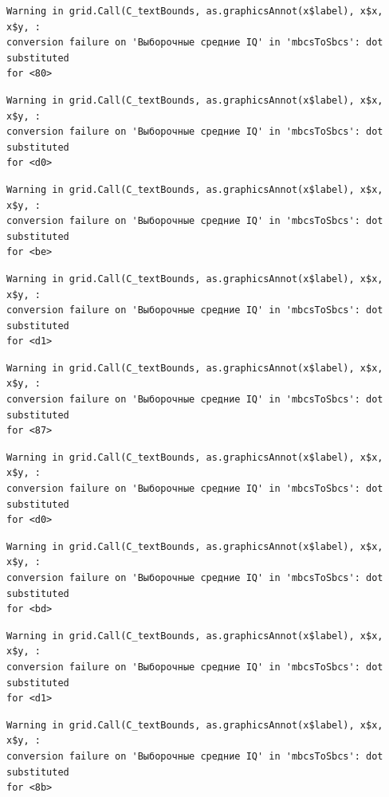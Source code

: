 \documentclass[
  letterpaper,
  DIV=11,
  numbers=noendperiod]{scrreprt}
\theoremstyle{definition}
\theoremstyle{remark}
\begin{document}
\begin{verbatim}
Warning in grid.Call(C_textBounds, as.graphicsAnnot(x$label), x$x, x$y, :
conversion failure on 'Выборочные средние IQ' in 'mbcsToSbcs': dot substituted
for <80>
\end{verbatim}

\begin{verbatim}
Warning in grid.Call(C_textBounds, as.graphicsAnnot(x$label), x$x, x$y, :
conversion failure on 'Выборочные средние IQ' in 'mbcsToSbcs': dot substituted
for <d0>
\end{verbatim}

\begin{verbatim}
Warning in grid.Call(C_textBounds, as.graphicsAnnot(x$label), x$x, x$y, :
conversion failure on 'Выборочные средние IQ' in 'mbcsToSbcs': dot substituted
for <be>
\end{verbatim}

\begin{verbatim}
Warning in grid.Call(C_textBounds, as.graphicsAnnot(x$label), x$x, x$y, :
conversion failure on 'Выборочные средние IQ' in 'mbcsToSbcs': dot substituted
for <d1>
\end{verbatim}

\begin{verbatim}
Warning in grid.Call(C_textBounds, as.graphicsAnnot(x$label), x$x, x$y, :
conversion failure on 'Выборочные средние IQ' in 'mbcsToSbcs': dot substituted
for <87>
\end{verbatim}

\begin{verbatim}
Warning in grid.Call(C_textBounds, as.graphicsAnnot(x$label), x$x, x$y, :
conversion failure on 'Выборочные средние IQ' in 'mbcsToSbcs': dot substituted
for <d0>
\end{verbatim}

\begin{verbatim}
Warning in grid.Call(C_textBounds, as.graphicsAnnot(x$label), x$x, x$y, :
conversion failure on 'Выборочные средние IQ' in 'mbcsToSbcs': dot substituted
for <bd>
\end{verbatim}

\begin{verbatim}
Warning in grid.Call(C_textBounds, as.graphicsAnnot(x$label), x$x, x$y, :
conversion failure on 'Выборочные средние IQ' in 'mbcsToSbcs': dot substituted
for <d1>
\end{verbatim}

\begin{verbatim}
Warning in grid.Call(C_textBounds, as.graphicsAnnot(x$label), x$x, x$y, :
conversion failure on 'Выборочные средние IQ' in 'mbcsToSbcs': dot substituted
for <8b>
\end{verbatim}
\end{document}
